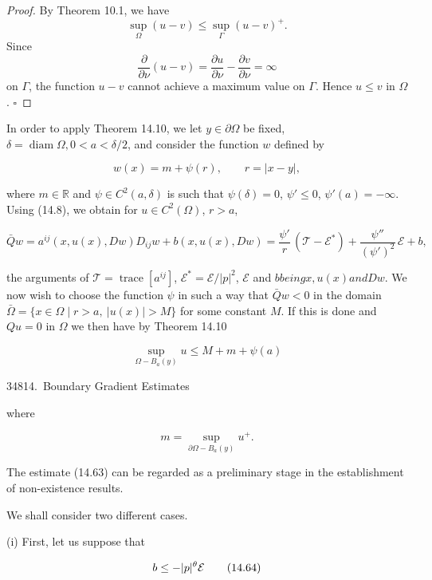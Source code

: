 \begin{proof}
By Theorem 10.1, we have
\[
\sup_{\Omega}(u-v)\le \sup_{\Gamma}(u-v)^+.
\]
Since
\[
\frac{\partial}{\partial \nu}(u-v)=\frac{\partial u}{\partial \nu}-\frac{\partial v}{\partial \nu}=\infty
\]
on $\Gamma$, the function $u-v$ cannot achieve a maximum value on $\Gamma$. Hence $u\le v$ in $\Omega$. $\square$
\end{proof}

In order to apply Theorem 14.10, we let $y\in \partial\Omega$ be fixed, $\delta = \operatorname{diam}\Omega, 0<a<\delta/2$, and consider the function $w$ defined by

\[
w(x)=m+\psi(r), \qquad r=|x-y|,
\]

where $m \in \mathbb{R}$ and $\psi \in C^2(a,\delta)$ is such that $\psi(\delta)=0$, $\psi' \le 0$, $\psi'(a)=-\infty$. Using (14.8), we obtain for $u \in C^2(\Omega)$, $r>a$,

\begin{equation}
\bar{Q}w=a^{ij}(x,u(x),Dw)D_{ij}w+b(x,u(x),Dw)
=\frac{\psi'}{r}\,(\mathcal{T}-\mathcal{E}^*)+\frac{\psi''}{(\psi')^2}\,\mathcal{E}+b,
\tag{14.62}
\end{equation}

the arguments of $\mathcal{T}=\operatorname{trace}[a^{ij}]$, $\mathcal{E}^*=\mathcal{E}/|p|^2$, $\mathcal{E}$ and $b being x, u(x) and Dw$. We now wish to choose the function $\psi$ in such a way that $\bar{Q}w<0$ in the domain $\bar{\Omega}=\{x\in \Omega \mid r>a,\ |u(x)|>M\}$ for some constant $M$. If this is done and $Qu=0$ in $\Omega$ we then have by Theorem 14.10

\begin{equation}
\sup_{\Omega-B_a(y)} u \le M+m+\psi(a)
\tag{14.63}
\end{equation}






348\hfill 14.\ Boundary Gradient Estimates

where

\[
m=\sup_{\partial\Omega-B_a(y)}u^+.
\]

The estimate (14.63) can be regarded as a preliminary stage in the establishment of non-existence results.

We shall consider two different cases.

(i) First, let us suppose that

\begin{equation}
b\leq -|p|^\theta \mathcal{E}
\tag{14.64}
\end{equation}

